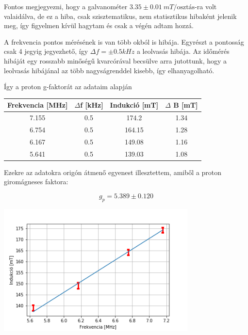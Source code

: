 \documentclass[a4paper,12pt]{article}
\begin{document}
\par Fontos megjegyezni, hogy a galvanométer $3.35 \pm 0.01 ~mT/\text{osztás}$-ra volt valaidálva, de ez a hiba, csak szisztematikus, nem statisztikus hibaként jelenik meg, így figyelmen kívül hagytam és csak a végén adtam hozzá.

\par A frekvencia pontos mérésének is van több okból is hibája. Egyrészt a pontosság csak 4 jegyig jegyezhető, így $\Delta f = \pm 0.5 kHz$ a leolvasás hibája. Az időmérés hibáját egy rosszabb minőségű kvarcórával becsülve arra jutottunk, hogy a leolvasás hibájánal az több nagyságrenddel kisebb, így elhanyagolható. 

\par Így a proton g-faktorát az adataim alapján

\begin{center}
\begin{tabular}{|c|c|c|c|}
\hline
Frekvencia [MHz] & $\Delta$f [kHz] & Indukció [mT] & $\Delta$ B [mT] \\
\hline
7.155 & 0.5 & 174.2 & 1.34 \\
\hline
6.754 & 0.5 & 164.15 & 1.28 \\
\hline
6.167 & 0.5 & 149.08 & 1.16 \\
\hline
5.641 & 0.5 & 139.03 & 1.08 \\
\hline
\end{tabular}
\end{center}

\par Ezekre az adatokra origón átmenő egyenest illesztettem, amiből a proton giromágneses faktora:

\begin{equation*}
g_{p} = 5.389 \pm 0.120
\end{equation*}

\begin{center}
\includegraphics[width=0.75\textwidth]{./egyenes.png}
\end{center}
\end{document}
